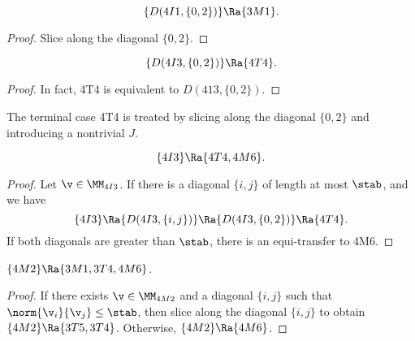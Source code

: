 \begin{lemma}[]
\[
\{D(4I1,\{0,2\})\}\Ra \{3M1\}.
\]
\end{lemma}

\begin{proof}
Slice along the diagonal $\{0,2\}$.
\end{proof}

\begin{lemma}[]
\[
\{D(4I3,\{0,2\})\}\Ra \{4T4\}.
\]
\end{lemma}

\begin{proof}
In fact,  4T4 is equivalent to $D(413,\{0,2\})$.
\end{proof}

\begin{remark}  The terminal case 4T4 is treated by slicing along the diagonal $\{0,2\}$ and introducing
a nontrivial $J$.
\end{remark}

\begin{lemma}[]
\[
\{4I3\}\Ra\{4T4,4M6\}.
\]
\end{lemma}

\begin{proof}
Let $\v\in \MM_{4I3}$.  
If there is a diagonal $\{i,j\}$ of length at most $\stab$, and we have
\[
\{4I3\}\Ra\{D(4I3,\{i,j\})\}\Ra \{D(4I3,\{0,2\})\} \Ra\{4T4\}.
\]
If both diagonals are greater than $\stab$, there is an equi-transfer to 4M6.
\end{proof}



\begin{lemma}[]
$\{4M2\}\Ra\{3M1,3T4,4M6\}$.
\end{lemma}

\begin{proof}
If there exists $\v\in \MM_{4M2}$ and a diagonal $\{i,j\}$ such that $\norm{\v_i}{\v_j}\le \stab$,
then slice along the diagonal $\{i,j\}$ to obtain $\{4M2\}\Ra \{3T5,3T4\}$.
Otherwise, $\{4M2\}\Ra\{4M6\}$.
\end{proof}

